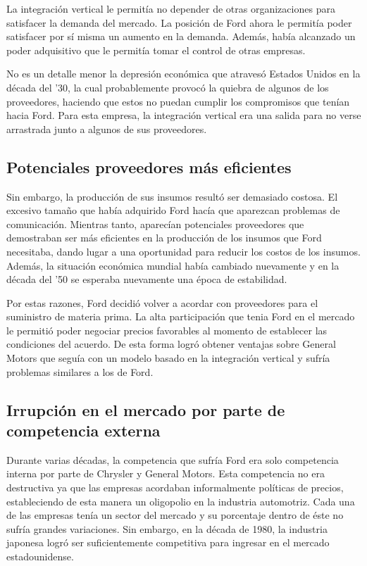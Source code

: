 		La integraci\'on vertical le permitía no depender de otras organizaciones para satisfacer la demanda del mercado.
		La posici\'on de Ford ahora le permitía poder satisfacer por sí misma un aumento en la demanda.
		Adem\'as, había alcanzado un poder adquisitivo que le permitía tomar el control de otras empresas.

		No es un detalle menor la depresi\'on econ\'omica que atraves\'o Estados Unidos en la d\'ecada del '30, la cual probablemente provoc\'o la quiebra de algunos de los proveedores, haciendo que estos no puedan cumplir los compromisos que tenían hacia Ford. 
		Para esta empresa, la integraci\'on vertical era una salida para no verse arrastrada junto a algunos de sus proveedores.

	\subsection{Potenciales proveedores m\'as eficientes}
		Sin embargo, la producci\'on de sus insumos result\'o ser demasiado costosa.
		El excesivo tama\~no que había adquirido Ford hacía que aparezcan problemas de comunicaci\'on.
		Mientras tanto, aparecían potenciales proveedores que demostraban ser m\'as eficientes en la producci\'on de los insumos que Ford necesitaba, dando lugar a una oportunidad para reducir los costos de los insumos.
		Adem\'as, la situaci\'on econ\'omica mundial había cambiado nuevamente y en la d\'ecada del '50 se esperaba nuevamente una \'epoca de estabilidad.

		Por estas razones, Ford decidi\'o volver a acordar con proveedores para el suministro de materia prima.
		La alta participaci\'on que tenia Ford en el mercado le permiti\'o poder negociar precios favorables al momento de establecer las condiciones del acuerdo.
		De esta forma logr\'o obtener ventajas sobre General Motors que seguía con un modelo basado en la integraci\'on vertical y sufría problemas similares a los de Ford.

	\subsection{Irrupci\'on en el mercado por parte de competencia externa}
		Durante varias d\'ecadas, la competencia que sufría Ford era solo competencia interna por parte de Chrysler y General Motors.
		Esta competencia no era destructiva ya que las empresas acordaban informalmente políticas de precios, estableciendo de esta manera un oligopolio en la industria automotriz.
		Cada una de las empresas tenía un sector del mercado y su porcentaje dentro de \'este no sufría grandes variaciones.
		Sin embargo, en la d\'ecada de 1980, la industria japonesa logr\'o ser suficientemente competitiva para ingresar en el mercado estadounidense.

